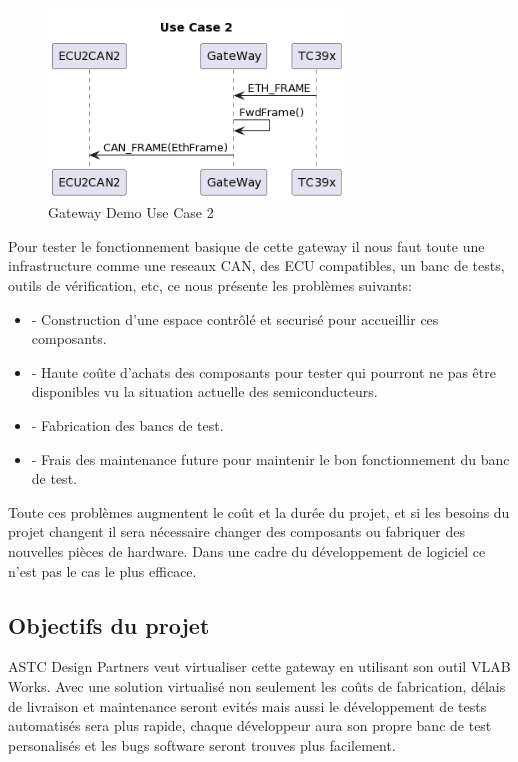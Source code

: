 \begin{figure}[!htb]
 \centering
 \includegraphics[width=0.7\textwidth]{img/GWUseCase2.png}
 \caption{Gateway Demo Use Case 2}
 \label{fig:gw-demo-uc2}
\end{figure}

Pour tester le fonctionnement basique de cette gateway il nous faut toute une infrastructure comme une reseaux CAN, des ECU compatibles, un banc de tests, outils de vérification, etc, ce nous présente les probl\`emes suivants:
\begin{itemize}
    \item - Construction d'une espace contr\^ol\'e et securis\'e pour accueillir ces composants.
    \item - Haute coûte d'achats des composants pour tester qui pourront ne pas être disponibles vu la situation actuelle des semiconducteurs.
    \item - Fabrication des bancs de test.
    \item - Frais des maintenance future pour maintenir le bon fonctionnement du banc de test.  
\end{itemize}

Toute ces probl\`emes augmentent le co\^ut et la dur\'ee du projet, et si les besoins du projet changent il sera nécessaire changer des composants ou fabriquer des nouvelles pièces de hardware. Dans une cadre du développement de logiciel ce n'est pas le cas le plus efficace.

\subsection{Objectifs du projet}

ASTC Design Partners veut virtualiser cette gateway en utilisant son outil VLAB Works. Avec une solution virtualis\'e non seulement les coûts de fabrication, délais de livraison et maintenance seront evit\'es mais aussi le développement de tests automatis\'es sera plus rapide, chaque développeur aura son propre banc de test personalis\'es et les bugs software seront trouves plus facilement. 


